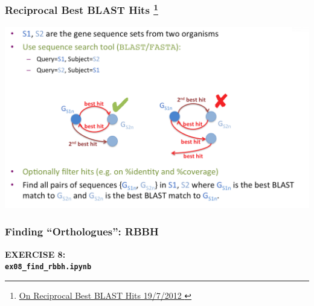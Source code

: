 
\begin{frame}
  \frametitle{Reciprocal Best BLAST Hits
    \footnote{\tiny\href{http://armchairbiology.blogspot.co.uk/2012/07/on-reciprocal-best-blast-hits.html}{On Reciprocal Best BLAST Hits 19/7/2012
    }}
  }
  \begin{center}
      \includegraphics[width=1\textwidth]{images/rbbh}      
  \end{center}
\end{frame}

%
\begin{frame}
  \frametitle{Finding ``Orthologues'': RBBH}
  \Large{
    \textcolor{hutton_blue}{
      \textbf{
      EXERCISE 8: \\
      \texttt{ex08\_find\_rbbh.ipynb}
      }
    }
  }
\end{frame}